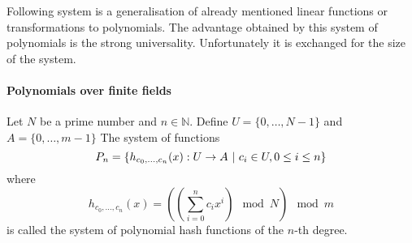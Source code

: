 Following system is a generalisation of already mentioned linear functions or transformations to polynomials. The advantage obtained by this system of polynomials is the strong universality. Unfortunately it is exchanged for the size of the system.

\paragraph{Polynomials over finite fields}
\begin{definition}
Let $N$ be a prime number and $n \in \mathbb{N}$. Define $U = \{0, \dots, N - 1 \}$ and $A = \{0, \dots, m - 1\}$ The system of functions \[ P_n = \left\lbrace h_{c_0, \dots, c_n}(x): U \rightarrow A \ | \  c_i \in U, 0 \leq i \leq n \right\rbrace \] where \[ h_{c_0, \dots, c_n}(x) = \left( \left(\displaystyle \sum_{i=0}^{n} c_i x^i \right) \mod N \right) \mod m \] is called the system of polynomial hash functions of the $n$-th degree.
\end{definition}

